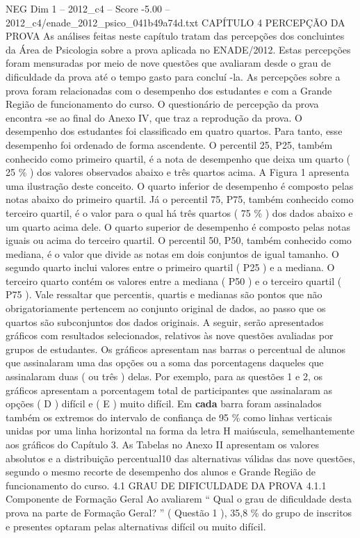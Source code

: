 \begin{textsample}{NEG Dim 1 – 2012\_c4 – Score -5.00 – 2012\_c4/enade\_2012\_psico\_041b49a74d.txt}  \label{ex:f1_neg_078}
CAPÍTULO 4 PERCEPÇÃO DA PROVA As análises feitas neste capítulo tratam das percepções dos concluintes da Área de Psicologia sobre a prova aplicada no ENADE/2012.
Estas percepções foram mensuradas por meio de nove questões que avaliaram desde o grau de dificuldade da prova até o tempo gasto para concluí -la.
As percepções sobre a prova foram relacionadas com o desempenho dos estudantes e com a Grande Região de funcionamento do curso.
O questionário de percepção da prova encontra -se ao final do Anexo IV, que traz a reprodução da prova.
O desempenho dos estudantes foi classificado em quatro quartos.
Para tanto, esse desempenho foi ordenado de forma ascendente.
O percentil 25, P25, também conhecido como primeiro quartil, é a nota de desempenho que deixa um quarto ( 25 \% ) dos valores observados abaixo e três quartos acima.
A Figura 1 apresenta uma ilustração deste conceito.
O quarto inferior de desempenho é composto pelas notas abaixo do primeiro quartil.
Já o percentil 75, P75, também conhecido como terceiro quartil, é o valor para o qual há três quartos ( 75 \% ) dos dados abaixo e um quarto acima dele.
O quarto superior de desempenho é composto pelas notas iguais ou acima do terceiro quartil.
O percentil 50, P50, também conhecido como mediana, é o valor que divide as notas em dois conjuntos de igual tamanho.
O segundo quarto inclui valores entre o primeiro quartil ( P25 ) e a mediana.
O terceiro quarto contém os valores entre a mediana ( P50 ) e o terceiro quartil ( P75 ).
Vale ressaltar que percentis, quartis e medianas são pontos que não obrigatoriamente pertencem ao conjunto original de dados, ao passo que os quartos são subconjuntos dos dados originais.
A seguir, serão apresentados gráficos com resultados selecionados, relativos às nove questões avaliadas por grupos de estudantes.
Os gráficos apresentam nas barras o percentual de alunos que assinalaram uma das opções ou a soma das porcentagens daqueles que assinalaram duas ( ou três ) delas.
Por exemplo, para as questões 1 e 2, os gráficos apresentam a porcentagem total de participantes que assinalaram as opções ( D ) difícil e ( E ) muito difícil.
Em \textbf{cada} barra foram assinalados também os extremos do intervalo de confiança de 95 \% como linhas verticais unidas por uma linha horizontal na forma da letra H maiúscula, semelhantemente aos gráficos do Capítulo 3.
As Tabelas no Anexo II apresentam os valores absolutos e a distribuição percentual10 das alternativas válidas das nove questões, segundo o mesmo recorte de desempenho dos alunos e Grande Região de funcionamento do curso. 4.1 GRAU DE DIFICULDADE DA PROVA 4.1.1 Componente de Formação Geral Ao avaliarem “ Qual o grau de dificuldade desta prova na parte de Formação Geral? ” ( Questão 1 ), 35,8 \% do grupo de inscritos e presentes optaram pelas alternativas difícil ou muito difícil.

\end{textsample}

